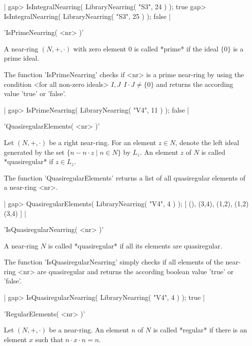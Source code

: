 |  gap> IsIntegralNearring( LibraryNearring( "S3", 24 ) );
  true
  gap> IsIntegralNearring( LibraryNearring( "S3", 25 ) );
  false
|

   
'IsPrimeNearring( <nr> )'  

A near-ring $(N,+,\cdot)$ with zero element $0$ is called *prime* if 
the ideal $\{ 0 \}$ is a prime ideal.

The function 'IsPrimeNearring' checks if <nr> is a prime near-ring
by using the condition <for all non-zero ideals> $I,J\:\ I \cdot J \ne 
\{ 0 \}$ and returns the according value 'true' or 'false'.

|  gap> IsPrimeNearring( LibraryNearring( "V4", 11 ) );   
  false
|

   
'QuasiregularElements( <nr> )'  

Let $(N,+,\cdot)$ be a right near-ring. For an element $z \in N$, 
denote the left ideal generated by the set $\{n - n\cdot z \mid n \in N\}$
by $L_z$.
An element $z$ of $N$ is 
called *quasiregular* if $z \in L_z$.

The function 'QuasiregularElements' returns a list of all 
quasiregular elements of a near-ring <nr>.

|  gap> QuasiregularElements( LibraryNearring( "V4", 4 ) ); 
  [ (), (3,4), (1,2), (1,2)(3,4) ]
|

   
'IsQuasiregularNearring( <nr> )'  

A near-ring $N$ is called *quasiregular* if all its elements are
quasiregular.

The function 'IsQuasiregularNearring' simply checks if all elements
of the near-ring <nr> are quasiregular and returns the according 
boolean value 'true' or 'false'.

|  gap> IsQuasiregularNearring( LibraryNearring( "V4", 4 ) );
  true
|

   
'RegularElements( <nr> )'  

Let $(N,+,\cdot)$ be a near-ring. An element $n$ of $N$ is 
called *regular* if there is an element $x$ such that 
$n\cdot x\cdot n = n$.

